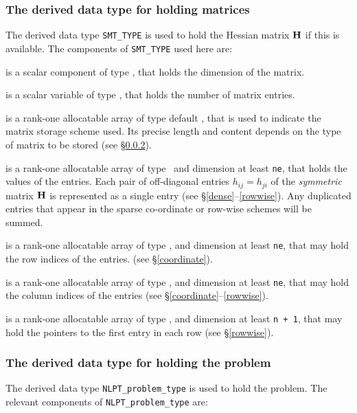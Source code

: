 \documentclass{galahad}
\begin{document}
\subsubsection{The derived data type for holding matrices}\label{typesmt}
The derived data type {\tt SMT\_TYPE} is used to hold the Hessian matrix ${\mathbf{H}}$
if this is available. The components of {\tt SMT\_TYPE} used here are:

\begin{description}

 is a scalar component of type \integer,
that holds the dimension of the matrix.

 is a scalar variable of type \integer, that
holds the number of matrix entries.

 is a rank-one allocatable array of type default \character, that
is used to indicate the matrix storage scheme used. Its precise length and
content depends on the type of matrix to be stored (see \S\ref{typeprob}).

 is a rank-one allocatable array of type \realdp\,
and dimension at least {\tt ne}, that holds the values of the entries.
Each pair of off-diagonal entries $h_{ij} = h_{ji}$ of the {\em symmetric}
matrix ${\mathbf{H}}$ is represented as a single entry
(see \S\ref{dense}--\ref{rowwise}).
Any duplicated entries that appear in the sparse
co-ordinate or row-wise schemes will be summed.

 is a rank-one allocatable array of type \integer,
and dimension at least {\tt ne}, that may hold the row indices of the entries.
(see \S\ref{coordinate}).

 is a rank-one allocatable array of type \integer,
and dimension at least {\tt ne}, that may hold the column indices of the entries
(see \S\ref{coordinate}--\ref{rowwise}).

 is a rank-one allocatable array of type \integer,
and dimension at least {\tt n + 1}, that may hold the pointers to
the first entry in each row (see \S\ref{rowwise}).

\end{description}


\subsubsection{The derived data type for holding the problem}\label{typeprob}
The derived data type {\tt NLPT\_problem\_type} is used to hold
the problem. The relevant components of
{\tt NLPT\_problem\_type}
are:
\end{document}
